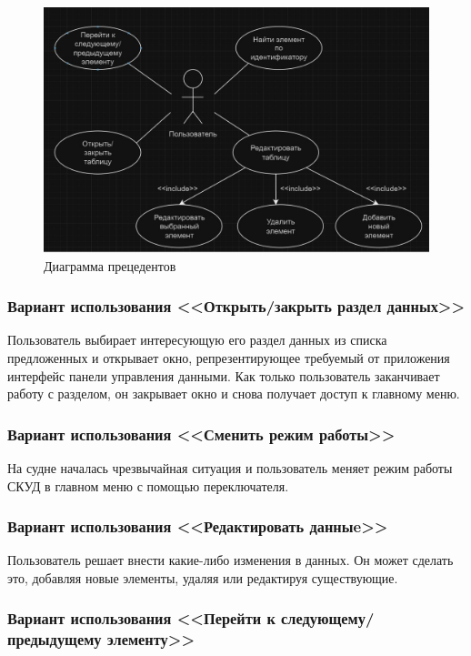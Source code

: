\begin{figure}[ht]
	\centering
	\includegraphics[width=1.05\linewidth]{images/CommonScheme2}
	\caption{Диаграмма прецедентов}
	\label{fig:commonscheme2}
\end{figure}

\subsubsection{Вариант использования <<Открыть/закрыть раздел данных>>}

Пользователь выбирает интересующую его раздел данных из списка предложенных и открывает окно, репрезентирующее требуемый от приложения интерфейс панели управления данными. Как только пользователь заканчивает работу с разделом, он закрывает окно и снова получает доступ к главному меню.
\subsubsection{Вариант использования <<Сменить режим работы>>}

На судне началась чрезвычайная ситуация и пользователь меняет режим работы СКУД в главном меню с помощью переключателя.

\subsubsection{Вариант использования <<Редактировать данныe>>}

Пользователь решает внести какие-либо изменения в данных. Он может сделать это, добавляя новые элементы, удаляя или редактируя существующие.

\subsubsection{Вариант использования <<Перейти к следующему/предыдущему элементу>>}

